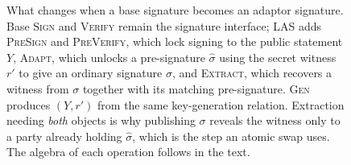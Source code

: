 \begin{figure}[htbp]
  \caption[The four functions LAS adds to the base signature]{What changes when a base
  signature becomes an adaptor signature. Base \textsc{Sign} and \textsc{Verify} remain
  the signature interface; LAS adds \textsc{PreSign} and \textsc{PreVerify}, which lock
  signing to the public statement $Y$, \textsc{Adapt}, which unlocks a pre-signature
  $\hat{\sigma}$ using the secret witness $r'$ to give an ordinary signature $\sigma$,
  and \textsc{Extract}, which recovers a witness from $\sigma$ together with its
  matching pre-signature. \textsc{Gen} produces $(Y,r')$ from the same key-generation
  relation. Extraction needing \emph{both} objects is why publishing $\sigma$ reveals
  the witness only to a party already holding $\hat{\sigma}$, which is the step an atomic
  swap uses. The algebra of each operation follows in the text.}
  \label{fig:lasfuncs}
\end{figure}

